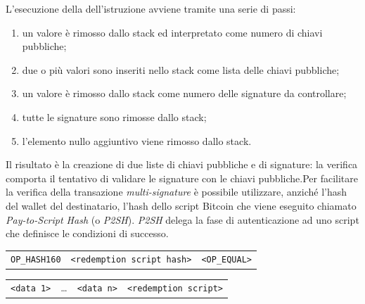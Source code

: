 L'esecuzione della dell'istruzione avviene tramite una serie di passi:
\begin{enumerate}
    \item un valore è rimosso dallo stack ed interpretato come numero di chiavi pubbliche;
    \item due o più valori sono inseriti nello stack come lista delle chiavi pubbliche;
    \item un valore è rimosso dallo stack come numero delle signature da controllare;
    \item tutte le signature sono rimosse dallo stack;
    \item l'elemento nullo aggiuntivo viene rimosso dallo stack.
\end{enumerate}
Il risultato è la creazione di due liste di chiavi pubbliche e di signature: la verifica comporta il tentativo di validare le signature con le chiavi pubbliche.\newline Per facilitare la verifica della transazione \textit{multi-signature} è possibile utilizzare, anziché l'hash del wallet del destinatario, l'hash dello script Bitcoin che viene eseguito chiamato \textit{Pay-to-Script Hash} (o \textit{P2SH}). \textit{P2SH} delega la fase di autenticazione ad uno script che definisce le condizioni di successo.\\
\begin{table}[H]
    \centering
    \begin{tabular}{c|c|c}
        \texttt{OP\_HASH160} & \texttt{<redemption script hash>} & \texttt{<OP\_EQUAL>}
    \end{tabular}
\end{table}
\begin{table}[H]
    \centering
    \begin{tabular}{c|c|c|c}
        \texttt{<data 1>} & \dots & \texttt{<data n>} & \texttt{<redemption script>}
    \end{tabular}
\end{table}

